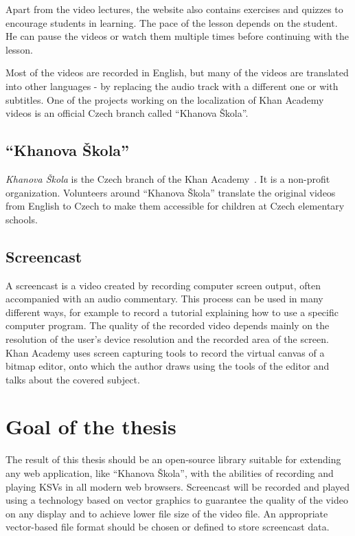 Apart from the video lectures, the website also contains exercises and quizzes to encourage students in learning. The pace of the lesson depends on the student. He can pause the videos or watch them multiple times before continuing with the lesson.

Most of the videos are recorded in English, but many of the videos are translated into other languages - by replacing the audio track with a different one or with subtitles. One of the projects working on the localization of Khan Academy videos is an official Czech branch called ``Khanova Škola''.

\subsection*{``Khanova Škola''}
\textit{Khanova Škola} is the Czech branch of the Khan Academy~\cite{khanova_skola}. It is a non-profit organization. Volunteers around ``Khanova Škola'' translate the original videos from English to Czech to make them accessible for children at Czech elementary schools.

\subsection*{Screencast}
A screencast is a video created by recording computer screen output, often accompanied with an audio commentary. This process can be used in many different ways, for example to record a tutorial explaining how to use a specific computer program. The quality of the recorded video depends mainly on the resolution of the user's device resolution and the recorded area of the screen. Khan Academy uses screen capturing tools to record the virtual canvas of a bitmap editor, onto which the author draws using the tools of the editor and talks about the covered subject.

\section*{Goal of the thesis}

The result of this thesis should be an open-source library suitable for extending any web application, like ``Khanova Škola'', with the abilities of recording and playing KSVs in all modern web browsers. Screencast will be recorded and played using a technology based on vector graphics to guarantee the quality of the video on any display and to achieve lower file size of the video file. An appropriate vector-based file format should be chosen or defined to store screencast data.

